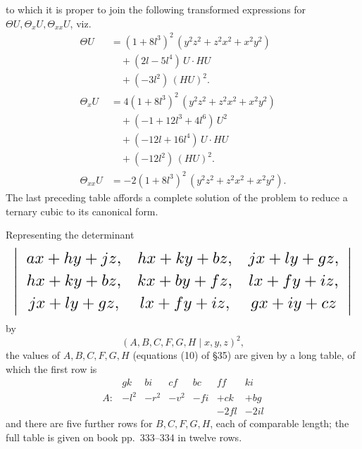 \documentclass[11pt]{article}
\begin{document}
to which it is proper to join the following transformed expressions for $\Theta U, \Theta_x U, \Theta_{xx} U$, viz.
\begin{align*}
\Theta U &= (1 + 8 l^3)^2\,(y^2 z^2 + z^2 x^2 + x^2 y^2) \\
       &\quad + (2 l - 5 l^4)\,U \cdot HU \\
       &\quad + (-3 l^2)\,(HU)^2. \\[3pt]
\Theta_x U &= 4(1 + 8 l^3)^2\,(y^2 z^2 + z^2 x^2 + x^2 y^2) \\
       &\quad + (-1 + 12 l^3 + 4 l^6)\,U^2 \\
       &\quad + (-12 l + 16 l^4)\,U \cdot HU \\
       &\quad + (-12 l^2)\,(HU)^2. \\[3pt]
\Theta_{xx} U &= -2(1 + 8 l^3)^2\,(y^2 z^2 + z^2 x^2 + x^2 y^2).
\end{align*}
The last preceding table affords a complete solution of the problem to reduce a ternary cubic to its canonical form.

\bigskip


\medskip

Representing the determinant
\[ \resizebox{\textwidth}{!}{$\displaystyle
\left|\begin{array}{ccc}
ax + hy + jz, & hx + ky + bz, & jx + ly + gz, \\[2pt]
hx + ky + bz, & kx + by + fz, & lx + fy + iz, \\[2pt]
jx + ly + gz, & lx + fy + iz, & gx + iy + cz
\end{array}\right|
$} \]
by
\[
(A, B, C, F, G, H \mid x, y, z)^2,
\]
the values of $A, B, C, F, G, H$ (equations (10) of \S 35) are given by a long table, of which the first row is
\[
\begin{array}{ccccccc}
 & gk & bi & cf & bc & ff & ki \\
A: & - l^2 & - r^2 & - v^2 & - fi & + ck & + bg \\
   &      &      &      &      & -2 fl & -2 il
\end{array}
\]
and there are five further rows for $B, C, F, G, H$, each of comparable length; the full table is given on book pp.~333--334 in twelve rows.
\end{document}

